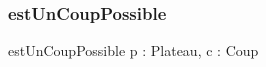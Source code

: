 \subsubsection{estUnCoupPossible}
\begin{algorithme}
\fonction
{estUnCoupPossible}
{p : Plateau, c : Coup}
{\booleen}
{}
{
}
\end{algorithme}